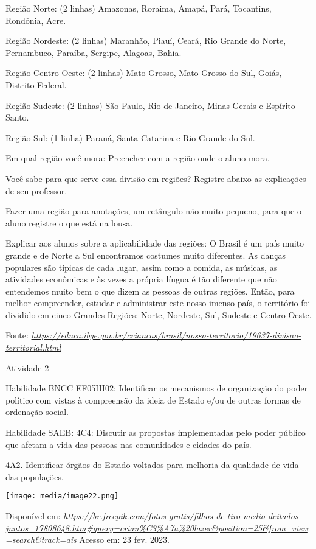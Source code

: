 Região Norte: (2 linhas) Amazonas, Roraima, Amapá, Pará, Tocantins,
Rondônia, Acre.

Região Nordeste: (2 linhas) Maranhão, Piauí, Ceará, Rio Grande do Norte,
Pernambuco, Paraíba, Sergipe, Alagoas, Bahia.

Região Centro-Oeste: (2 linhas) Mato Grosso, Mato Grosso do Sul, Goiás,
Distrito Federal.

Região Sudeste: (2 linhas) São Paulo, Rio de Janeiro, Minas Gerais e
Espírito Santo.

Região Sul: (1 linha) Paraná, Santa Catarina e Rio Grande do Sul.

Em qual região você mora: Preencher com a região onde o aluno mora.

Você sabe para que serve essa divisão em regiões? Registre abaixo as
explicações de seu professor.

Fazer uma região para anotações, um retângulo não muito pequeno, para
que o aluno registre o que está na lousa.

Explicar aos alunos sobre a aplicabilidade das regiões: O Brasil é um
país muito grande e de Norte a Sul encontramos costumes muito
diferentes. As danças populares são típicas de cada lugar, assim como a
comida, as músicas, as atividades econômicas e às vezes a própria língua
é tão diferente que não entendemos muito bem o que dizem as pessoas de
outras regiões. Então, para melhor compreender, estudar e administrar
este nosso imenso país, o território foi dividido em cinco Grandes
Regiões: Norte, Nordeste, Sul, Sudeste e Centro-Oeste.

Fonte:
\href{https://educa.ibge.gov.br/criancas/brasil/nosso-territorio/19637-divisao-territorial.html}{\emph{https://educa.ibge.gov.br/criancas/brasil/nosso-territorio/19637-divisao-territorial.html}}

Atividade 2

Habilidade BNCC EF05HI02: Identificar os mecanismos de organização do
poder político com vistas à compreensão da ideia de Estado e/ou de
outras formas de ordenação social.

Habilidade SAEB: 4C4: Discutir as propostas implementadas pelo poder
público que afetam a vida das pessoas nas comunidades e cidades do país.

4A2. Identificar órgãos do Estado voltados para melhoria da qualidade de
vida das populações.

\texttt{[image: media/image22.png]}

Disponível em:
\href{https://br.freepik.com/fotos-gratis/filhos-de-tiro-medio-deitados-juntos_17808648.htm\#query=crian\%C3\%A7a\%20lazer\&position=25\&from_view=search\&track=ais}{\emph{https://br.freepik.com/fotos-gratis/filhos-de-tiro-medio-deitados-juntos\_17808648.htm\#query=crian\%C3\%A7a\%20lazer\&position=25\&from\_view=search\&track=ais}}
Acesso em: 23 fev. 2023.

